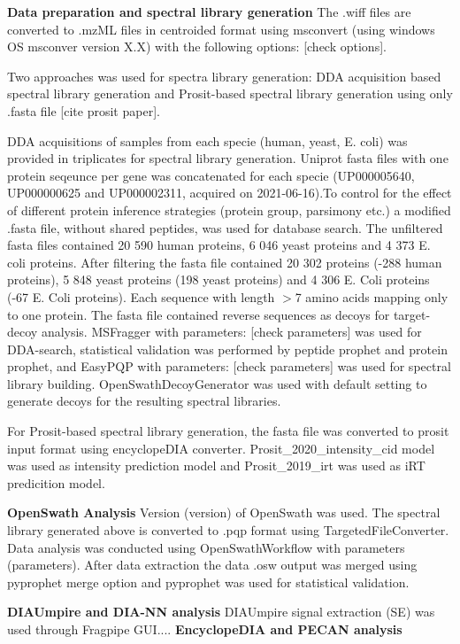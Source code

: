 \documentclass[10pt,letterpaper]{article}
\begin{document}
\textbf{Data preparation and spectral library generation}
The .wiff files are converted to .mzML files in centroided format using msconvert (using windows OS msconver version X.X) with the following options: [check options]. 

Two approaches was used for spectra library generation: DDA acquisition based spectral library generation and Prosit-based spectral library generation using only .fasta file [cite prosit paper]. 

DDA acquisitions of samples from each specie (human, yeast, E. coli) was provided in triplicates for spectral library generation. Uniprot fasta files with one protein seqeunce per gene was concatenated for each specie (UP000005640, UP000000625 and UP000002311, acquired on 2021-06-16).To control for the effect of different protein inference strategies (protein group, parsimony etc.) a modified .fasta file, without shared peptides, was used for database search. The unfiltered fasta files contained 20 590 human proteins, 6 046 yeast proteins and 4 373 E. coli proteins. After filtering the fasta file contained 20 302 proteins (-288 human proteins), 5 848 yeast proteins (198 yeast proteins) and 4 306 E. Coli proteins (-67 E. Coli proteins). Each sequence with length $>$7 amino acids mapping only to one protein. The fasta file contained reverse sequences as decoys for target-decoy analysis. MSFragger with parameters: [check parameters] was used for DDA-search, statistical validation was performed by peptide prophet and protein prophet, and EasyPQP with parameters: [check parameters] was used for spectral library building. OpenSwathDecoyGenerator was used with default setting to generate decoys for the resulting spectral libraries.  

For Prosit-based spectral library generation, the fasta file was converted to prosit input format using encyclopeDIA converter. Prosit_2020_intensity_cid model was used as intensity prediction model and Prosit_2019_irt was used as iRT predicition model.  


\textbf{OpenSwath Analysis}
Version (version) of OpenSwath was used. The spectral library generated above is converted to .pqp format using TargetedFileConverter. Data analysis was conducted using OpenSwathWorkflow with parameters (parameters). After data extraction the data .osw output was merged using pyprophet merge option and pyprophet was used for statistical validation. 

\textbf{DIAUmpire and DIA-NN analysis}
DIAUmpire signal extraction (SE) was used through Fragpipe GUI....
\textbf{EncyclopeDIA and PECAN analysis}
\end{document}
